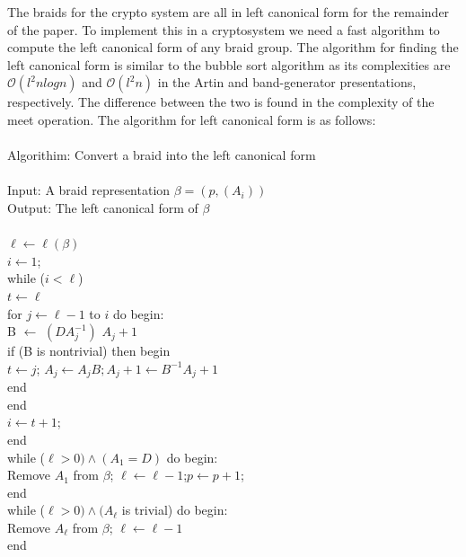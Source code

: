 \documentclass{article}
\theoremstyle{definition}
\begin{document}
	The braids for the crypto system are all in left canonical form for the remainder of the paper. To implement this in a cryptosystem we need a fast algorithm to compute the left canonical form of any braid group. The algorithm for finding the left canonical form is similar to the bubble sort algorithm as its complexities are $\mathcal{O}(l^2 n log{}n)$ and $\mathcal{O}(l^2 n)$ in the Artin and band-generator presentations, respectively. The difference between the two is found in the complexity of the meet operation. The algorithm for left canonical form is as follows:
	\\
	\\ Algorithim: Convert a braid into the left canonical form
	\\
	\\ \indent Input: A braid representation $\beta = (p, (A_i))$
	\\ \indent Output: The left canonical form of $\beta$
	\\
	\\ \indent $\ell \leftarrow \ell(\beta)$
	\\ \indent $i \leftarrow 1$;
	\\ \indent while ($i < \ell$)
	\\ \indent \indent $t \leftarrow \ell$
	\\ \indent  \indent for $ j \leftarrow \ell - 1$ to $i$ do begin:
	\\ \indent \indent \indent B $\leftarrow$ $(DA_j^{-1})$ $A_j+1$
	\\ \indent \indent \indent if (B is nontrivial) then begin
	\\ \indent \indent \indent \indent $t \leftarrow j$; $A_j \leftarrow A_j B; A_j+1 \leftarrow B^{-1} A_j+1$
	\\\indent \indent \indent end
	\\\indent \indent end
	\\ \indent $i \leftarrow t + 1$;
	\\ \indent end
	\\ \indent while ($\ell > 0) \land (A_1 = D)$ do begin:
	\\  \indent \indent Remove $A_1$ from $\beta$; $\ell \leftarrow \ell -1$;$p \leftarrow p +1$;
	\\ \indent end
	\\ \indent while ($\ell > 0) \land (A_\ell$ is trivial) do begin:
	\\ \indent \indent Remove $A_\ell$ from $\beta$; $\ell \leftarrow \ell -1$
	\\ \indent end
	
\end{document}
